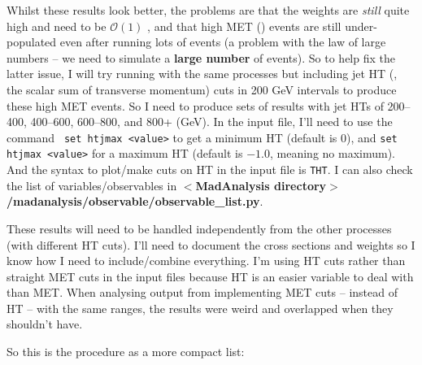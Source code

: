 Whilst these results look better, the problems are that the weights are \emph{still} quite high and need to be $\mathcal{O}(1)$ , and that high MET (\etmiss) events are still under-populated even after running lots of \madgraph events (a problem with the law of large numbers -- we need to simulate a \textbf{large number} of events). So to help fix the latter issue, I will try running \madgraph with the same processes but including jet HT (\HT, the scalar sum of transverse momentum) cuts in 200 GeV intervals to produce these high MET events. So I need to produce sets of results with jet HTs of 200--400, 400--600, 600--800, and 800+ (GeV). In the \madgraph input file, I'll need to use the command \verb! set htjmax <value>! to get a minimum HT (default is 0), and \verb!set htjmax <value>! for a maximum HT (default is $-1.0$, meaning no maximum). And the syntax to plot/make cuts on HT in the \madanalysis input file is \verb!THT!. I can also check the list of variables/observables in \textbf{$<$MadAnalysis directory$>$/madanalysis/observable/observable\_list.py}.

These results will need to be handled independently from the other processes (with different HT cuts). I'll need to document the cross sections and weights so I know how I need to include/combine everything. I'm using HT cuts rather than straight MET cuts in the \madgraph input files because HT is an easier variable to deal with than MET. When analysing output from implementing MET cuts -- instead of HT -- with the same ranges, the results were weird and overlapped when they shouldn't have.

So this is the procedure as a more compact list:

